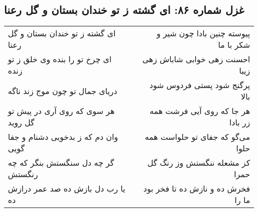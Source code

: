 \begin{center}
\section*{غزل شماره ۸۶: ای گشته ز تو خندان بستان و گل رعنا}
\label{sec:0086}
\begin{longtable}{l p{0.5cm} r}
ای گشته ز تو خندان بستان و گل رعنا
&&
پیوسته چنین بادا چون شیر و شکر با ما
\\
ای چرخ تو را بنده وی خلق ز تو زنده
&&
احسنت زهی خوابی شاباش زهی زیبا
\\
دریای جمال تو چون موج زند ناگه
&&
پرگنج شود پستی فردوس شود بالا
\\
هر سوی که روی آری در پیش تو گل روید
&&
هر جا که روی آیی فرشت همه زر بادا
\\
وان دم که ز بدخویی دشنام و جفا گویی
&&
می‌گو که جفای تو حلواست همه حلوا
\\
گر چه دل سنگستش بنگر که چه رنگستش
&&
کز مشعله ننگستش وز رنگ گل حمرا
\\
یا رب دل بازش ده صد عمر درازش ده
&&
فخرش ده و نازش ده تا فخر بود ما را
\\
\end{longtable}
\end{center}

